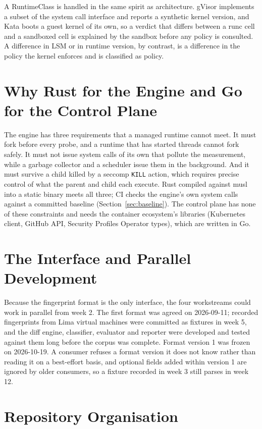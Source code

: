 A RuntimeClass is handled in the same spirit as architecture. gVisor implements a subset of the system call interface and reports a synthetic kernel version, and Kata boots a guest kernel of its own, so a verdict that differs between a runc cell and a sandboxed cell is explained by the sandbox before any policy is consulted. A difference in LSM or in runtime version, by contrast, is a difference in the policy the kernel enforces and is classified as policy.

\section{Why Rust for the Engine and Go for the Control Plane}

The engine has three requirements that a managed runtime cannot meet. It must fork before every probe, and a runtime that has started threads cannot fork safely. It must not issue system calls of its own that pollute the measurement, while a garbage collector and a scheduler issue them in the background. And it must survive a child killed by a seccomp \texttt{KILL} action, which requires precise control of what the parent and child each execute. Rust compiled against musl into a static binary meets all three; CI checks the engine's own system calls against a committed baseline (Section~\ref{sec:baseline}). The control plane has none of these constraints and needs the container ecosystem's libraries (Kubernetes client, GitHub API, Security Profiles Operator types), which are written in Go.

\section{The Interface and Parallel Development}

Because the fingerprint format is the only interface, the four workstreams could work in parallel from week 2. The first format was agreed on 2026-09-11; recorded fingerprints from Lima virtual machines were committed as fixtures in week 5, and the diff engine, classifier, evaluator and reporter were developed and tested against them long before the corpus was complete. Format version 1 was frozen on 2026-10-19. A consumer refuses a format version it does not know rather than reading it on a best-effort basis, and optional fields added within version 1 are ignored by older consumers, so a fixture recorded in week 3 still parses in week 12.

\section{Repository Organisation}

